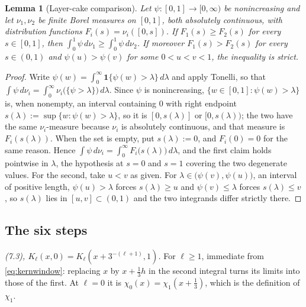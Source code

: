 \documentclass[11pt]{article}
\newtheorem{lemma}[theorem]{Lemma}
\theoremstyle{definition}
\theoremstyle{remark}
\begin{document}
\begin{lemma}[Layer-cake comparison]\label{lem:layercake}
Let $\psi:[0,1]\to[0,\infty)$ be nonincreasing and let $\nu_1,\nu_2$ be
finite Borel measures on $[0,1]$, both absolutely continuous, with
distribution functions $F_i(s)=\nu_i([0,s])$. If $F_1(s)\ge F_2(s)$ for
every $s\in[0,1]$, then $\int_0^1\psi\,d\nu_1\ge\int_0^1\psi\,d\nu_2$.
If moreover $F_1(s)>F_2(s)$ for every $s\in(0,1)$ and $\psi(u)>\psi(v)$
for some $0<u<v<1$, the inequality is strict.
\end{lemma}

\begin{proof}
Write $\psi(w)=\int_0^\infty\mathbf1\{\psi(w)>\lambda\}\,d\lambda$ and
apply Tonelli, so that
$\int\psi\,d\nu_i=\int_0^\infty\nu_i\bigl(\{\psi>\lambda\}\bigr)\,d\lambda$.
Since $\psi$ is nonincreasing, $\{w\in[0,1]:\psi(w)>\lambda\}$ is, when
nonempty, an interval containing $0$ with right endpoint
$s(\lambda):=\sup\{w:\psi(w)>\lambda\}$, so it is $[0,s(\lambda)]$ or
$[0,s(\lambda))$; the two have the same $\nu_i$-measure because $\nu_i$
is absolutely continuous, and that measure is $F_i(s(\lambda))$. When
the set is empty, put $s(\lambda):=0$, and $F_i(0)=0$ for the same
reason. Hence
$\int\psi\,d\nu_i=\int_0^\infty F_i\bigl(s(\lambda)\bigr)\,d\lambda$,
and the first claim holds pointwise in $\lambda$, the hypothesis at
$s=0$ and $s=1$ covering the two degenerate values. For the second,
take $u<v$ as given. For $\lambda\in\bigl(\psi(v),\psi(u)\bigr)$, an
interval of positive length, $\psi(u)>\lambda$ forces $s(\lambda)\ge u$
and $\psi(v)\le\lambda$ forces $s(\lambda)\le v$, so $s(\lambda)$ lies
in $[u,v]\subset(0,1)$ and the two integrands differ strictly there.
\end{proof}

\subsection*{The six steps}

\emph{(7.3), $K_\ell(x,0)=K_\ell(x+3^{-(\ell+1)},1)$.} For $\ell\ge1$,
immediate from \eqref{eq:kernwindow}: replacing $x$ by $x+\tfrac13h$ in
the second integral turns its limits into those of the first. At
$\ell=0$ it is $\chi_0(x)=\chi_1(x+\tfrac13)$, which is the definition
of $\chi_1$.
\end{document}
